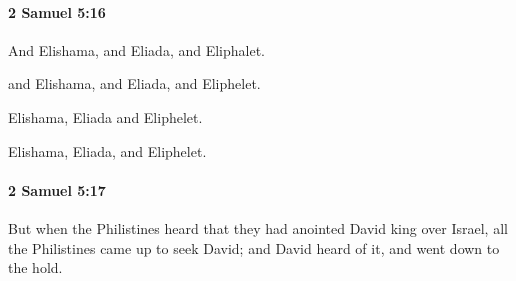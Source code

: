 		\paragraph{2 Samuel 5:16} %
			\label{2SAMUEL-5-16}

			And Elishama, and Eliada, and Eliphalet.

			\begin{versebox}
					\item[BHS] 
					\item[ASV] and Elishama, and Eliada, and Eliphelet.
					\item[NIV] Elishama, Eliada and Eliphelet.
					\item[NRSV] Elishama, Eliada, and Eliphelet.
			\end{versebox}

		\paragraph{2 Samuel 5:17} %
			\label{2SAMUEL-5-17}

			But when the Philistines heard that they had anointed David king over Israel, all the Philistines came up to seek David; and David heard of it, and went down to the hold.

